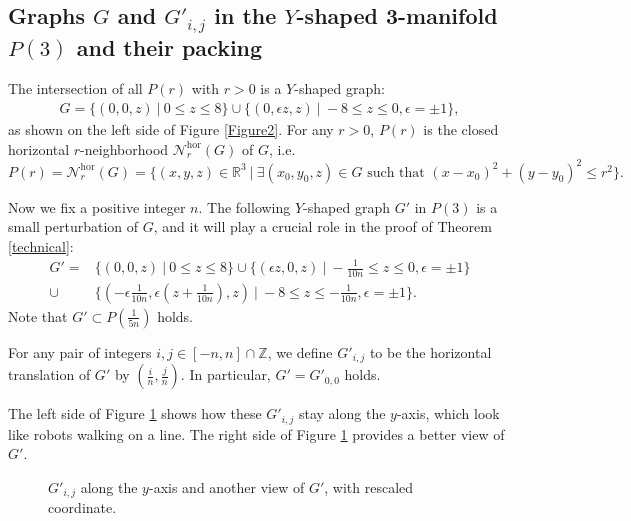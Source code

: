 \documentclass{amsart}
\begin{document}
\subsection{Graphs $G$ and $G'_{i,j}$ in the $Y$-shaped 3-manifold $P(3)$ and their packing}\label{graphs}

The intersection of all $P(r)$ with $r>0$ is a $Y$-shaped graph: 
\begin{equation}\label{straightgraph}
\begin{aligned}
G=\{(0,0,z)\ |\ 0\leq z\leq 8\} \cup \{(0,\epsilon z,z)\ |\ -8\leq z\leq 0, \epsilon=\pm 1\},
\end{aligned}
\end{equation}
as shown on the left side of Figure \ref{Figure2}.
For any $r>0$, $P(r)$ is the closed horizontal $r$-neighborhood $\mathcal{N}^{\text{hor}}_r(G)$ of $G$, i.e.
$$P(r)=\mathcal{N}^{\text{hor}}_r(G)=\{(x,y,z)\in \mathbb{R}^3\ |\ \exists(x_0,y_0,z)\in G \text{\ such\ that\ }(x-x_0)^2+(y-y_0)^2\leq r^2\}.$$

Now we fix a positive integer $n$. The following $Y$-shaped graph $G'$ in $P(3)$ is a small perturbation of $G$, and it will play a crucial role in the proof of Theorem \ref{technical}:
\begin{equation}\label{robot}
\begin{aligned}
G'= &\{(0,0,z)\ |\ 0\leq z\leq 8\} \cup \{(\epsilon z,0,z)\ |\ -\frac{1}{10n}\leq z\leq 0,\epsilon=\pm 1\}\\
\cup & \{(-\epsilon\frac{1}{10n},\epsilon(z+\frac{1}{10n}),z)\ |\ -8\leq z\leq -\frac{1}{10n},\epsilon=\pm1\}.
\end{aligned}
\end{equation}
Note that $G'\subset P(\frac{1}{5n})$ holds.

 For any pair of integers $i,j\in [-n,n]\cap \mathbb{Z}$, we define $G'_{i,j}$ to be the horizontal translation of $G'$ by $(\frac{i}{n},\frac{j}{n})$. In particular, $G'=G'_{0,0}$ holds. 
 
 The left side of Figure \ref{Figure3} shows how these  $G'_{i, j}$ stay along the $y$-axis, which look like robots walking on a line. The right side of Figure \ref{Figure3} provides a better view of $G'$.
 
 \begin{figure}[htbp]
    \centering
    \def\svgwidth{5in} %
    
    \caption{$G'_{i,j}$ along the $y$-axis and another view of $G'$, with rescaled coordinate.}
     \label{Figure3}
\end{figure}
 
\end{document}
